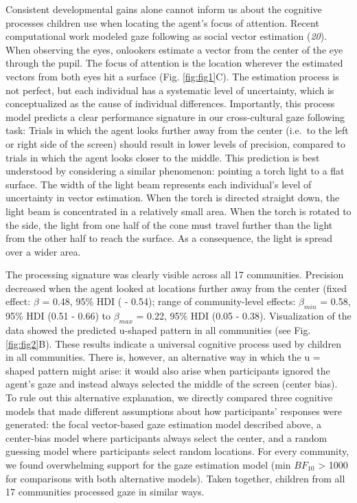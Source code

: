 \documentclass[
  man,floatsintext]{apa6}
\begin{document}
Consistent developmental gains alone cannot inform us about the cognitive processes children use when locating the agent's focus of attention. Recent computational work modeled gaze following as social vector estimation (\emph{20}). When observing the eyes, onlookers estimate a vector from the center of the eye through the pupil. The focus of attention is the location wherever the estimated vectors from both eyes hit a surface (Fig. \ref{fig:fig1}C). The estimation process is not perfect, but each individual has a systematic level of uncertainty, which is conceptualized as the cause of individual differences. Importantly, this process model predicts a clear performance signature in our cross-cultural gaze following task: Trials in which the agent looks further away from the center (i.e.~to the left or right side of the screen) should result in lower levels of precision, compared to trials in which the agent looks closer to the middle. This prediction is best understood by considering a similar phenomenon: pointing a torch light to a flat surface. The width of the light beam represents each individual's level of uncertainty in vector estimation. When the torch is directed straight down, the light beam is concentrated in a relatively small area. When the torch is rotated to the side, the light from one half of the cone must travel further than the light from the other half to reach the surface. As a consequence, the light is spread over a wider area.

The processing signature was clearly visible across all 17 communities. Precision decreased when the agent looked at locations further away from the center (fixed effect: \(\beta\) = 0.48, 95\% HDI ( - 0.54); range of community-level effects: \(\beta_{min}\) = 0.58, 95\% HDI (0.51 - 0.66) to \(\beta_{max}\) = 0.22, 95\% HDI (0.05 - 0.38). Visualization of the data showed the predicted u-shaped pattern in all communities (see Fig. \ref{fig:fig2}B). These results indicate a universal cognitive process used by children in all communities. There is, however, an alternative way in which the u = shaped pattern might arise: it would also arise when participants ignored the agent's gaze and instead always selected the middle of the screen (center bias). To rule out this alternative explanation, we directly compared three cognitive models that made different assumptions about how participants' responses were generated: the focal vector-based gaze estimation model described above, a center-bias model where participants always select the center, and a random guessing model where participants select random locations. For every community, we found overwhelming support for the gaze estimation model (min \(BF_{10}\) \textgreater{} 1000 for comparisons with both alternative models). Taken together, children from all 17 communities processed gaze in similar ways.
\end{document}
